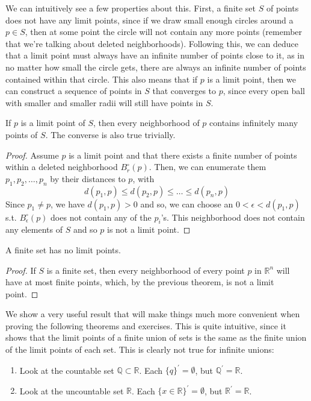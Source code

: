 \documentclass{article}
\begin{document}
    We can intuitively see a few properties about this. First, a finite set $S$ of points does not have any limit points, since if we draw small enough circles around a $p \in S$, then at some point the circle will not contain any more points (remember that we're talking about deleted neighborhoods). Following this, we can deduce that a limit point must always have an infinite number of points close to it, as in no matter how small the circle gets, there are always an infinite number of points contained within that circle. This also means that if $p$ is a limit point, then we can construct a sequence of points in $S$ that converges to $p$, since every open ball with smaller and smaller radii will still have points in $S$.

    \begin{theorem}
      If $p$ is a limit point of $S$, then every neighborhood of $p$ contains infinitely many points of $S$. The converse is also true trivially. 
    \end{theorem}
    \begin{proof}
      Assume $p$ is a limit point and that there exists a finite number of points within a deleted neighborhood $B_r^\circ (p)$. Then, we can enumerate them $p_1, p_2, \ldots, p_n$ by their distances to $p$, with 
      \begin{equation}
        d(p_1, p) \leq d(p_2, p) \leq \ldots \leq d(p_n, p)
      \end{equation}
      Since $p_1 \neq p$, we have $d(p_1, p) > 0$ and so, we can choose an $0 < \epsilon < d(p_1, p)$ s.t. $B_\epsilon^\circ (p)$ does not contain any of the $p_i$'s. This neighborhood does not contain any elements of $S$ and so $p$ is not a limit point. 
    \end{proof}

    \begin{corollary}
      A finite set has no limit points. 
    \end{corollary}
    \begin{proof}
      If $S$ is a finite set, then every neighborhood of every point $p$ in $\mathbb{R}^n$ will have at most finite points, which, by the previous theorem, is not a limit point. 
    \end{proof}

    We show a very useful result that will make things much more convenient when proving the following theorems and exercises. This is quite intuitive, since it shows that the limit points of a finite union of sets is the same as the finite union of the limit points of each set. This is clearly not true for infinite unions: 
    \begin{enumerate}
      \item Look at the countable set $\mathbb{Q} \subset \mathbb{R}$. Each $\{q\}^\prime = \emptyset$, but $\mathbb{Q}^\prime = \mathbb{R}$. 
      \item Look at the uncountable set $\mathbb{R}$. Each $\{x \in \mathbb{R}\}^\prime = \emptyset$, but $\mathbb{R}^\prime = \mathbb{R}$. 
    \end{enumerate}
\end{document}

